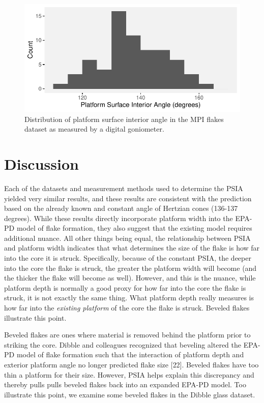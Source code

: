\documentclass[10pt,letterpaper]{article}
\begin{document}
\begin{figure}
\centering
\includegraphics{PSIA_Manuscript_files/figure-latex/fig10-mpi_data-1.pdf}
\caption{Distribution of platform surface interior angle in the MPI
flakes dataset as measured by a digital goniometer.}
\end{figure}

\hypertarget{discussion}{%
\section{Discussion}\label{discussion}}

Each of the datasets and measurement methods used to determine the PSIA
yielded very similar results, and these results are consistent with the
prediction based on the already known and constant angle of Hertzian
cones (136-137 degrees). While these results directly incorporate
platform width into the EPA-PD model of flake formation, they also
suggest that the existing model requires additional nuance. All other
things being equal, the relationship between PSIA and platform width
indicates that what determines the size of the flake is how far into the
core it is struck. Specifically, because of the constant PSIA, the
deeper into the core the flake is struck, the greater the platform width
will become (and the thicker the flake will become as well). However,
and this is the nuance, while platform depth is normally a good proxy
for how far into the core the flake is struck, it is not exactly the
same thing. What platform depth really measures is how far into the
\emph{existing platform} of the core the flake is struck. Beveled flakes
illustrate this point.

Beveled flakes are ones where material is removed behind the platform
prior to striking the core. Dibble and colleagues recognized that
beveling altered the EPA-PD model of flake formation such that the
interaction of platform depth and exterior platform angle no longer
predicted flake size {[}22{]}. Beveled flakes have too thin a platform
for their size. However, PSIA helps explain this discrepancy and thereby
pulls pulls beveled flakes back into an expanded EPA-PD model. Too
illustrate this point, we examine some beveled flakes in the Dibble
glass dataset.
\end{document}
